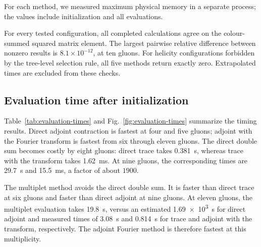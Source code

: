 \documentclass[aps,prd,twocolumn,superscriptaddress,nofootinbib]{revtex4-2}
\begin{document}
For each method, we measured maximum physical memory in a separate process;
the values include initialization and all evaluations.

For every tested configuration, all completed calculations agree on the
colour-summed squared matrix element.  The largest pairwise relative
difference between nonzero results is $8.1\times10^{-12}$, at ten gluons.  For
helicity configurations forbidden by the tree-level selection rule, all five
methods return exactly zero.  Extrapolated times are excluded from these
checks.

\subsection{Evaluation time after initialization}

Table~\ref{tab:evaluation-times} and Fig.~\ref{fig:evaluation-times} summarize
the timing results.  Direct adjoint contraction is fastest at four and five
gluons; adjoint with the Fourier transform is fastest from six through eleven
gluons.  The direct double sum becomes costly by eight gluons: direct trace
takes \SI{0.381}{s}, whereas trace with the transform takes \SI{1.62}{ms}.
At nine gluons, the corresponding times are \SI{29.7}{s} and \SI{15.5}{ms},
a factor of about $1900$.

The multiplet method avoids the direct double sum.  It is faster than direct
trace at six gluons and faster than direct adjoint at nine gluons.  At eleven
gluons, the multiplet evaluation takes \SI{19.8}{s}, versus an estimated
\SI{1.69e3}{s} for direct adjoint and measured times of \SI{3.08}{s} and
\SI{0.814}{s} for trace and adjoint with the transform, respectively.  The
adjoint Fourier method is therefore fastest at this multiplicity.
\end{document}
